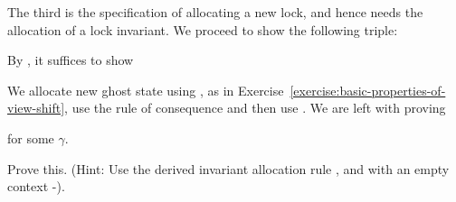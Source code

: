 \begin{example}
  The third is the specification of allocating a new lock, and hence needs the allocation of a lock invariant.
  We proceed to show the following triple:
  \begin{mathpar}
  \end{mathpar}
  By , it suffices to show
  \begin{mathpar}
  \end{mathpar}
  We allocate new ghost state using , as in Exercise~\ref{exercise:basic-properties-of-view-shift}, use the rule of consequence and then use .
  We are left with proving
  \begin{mathpar}
  \end{mathpar}
  for some $\gamma$.
  \begin{exercise}
    Prove this.
    (Hint: Use the derived invariant allocation rule ,
    and  with an empty context -).
  \end{exercise}
  

\end{example}
